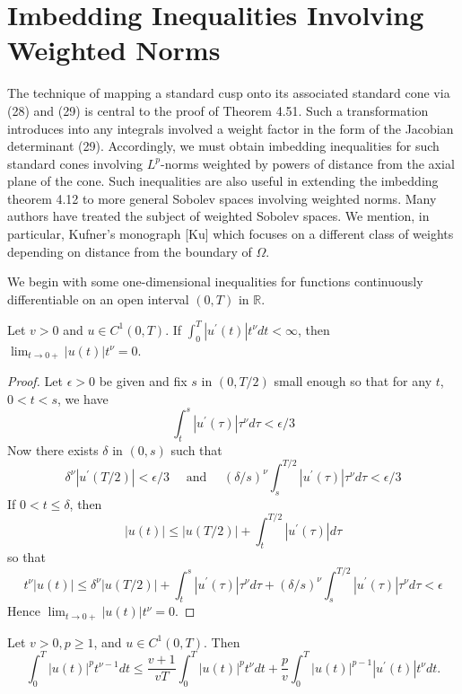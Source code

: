 \section{Imbedding Inequalities Involving Weighted Norms}


\begin{para}
  The technique of mapping a standard cusp onto its associated standard cone via (28) and (29) is central to the proof of Theorem 4.51. Such a transformation introduces into any integrals involved a weight factor in the form of the Jacobian determinant (29). Accordingly, we must obtain imbedding inequalities for such standard cones involving $L^p$-norms weighted by powers of distance from the axial plane of the cone. Such inequalities are also useful in extending the imbedding theorem 4.12 to more general Sobolev spaces involving weighted norms. Many authors have treated the subject of weighted Sobolev spaces. We mention, in
  particular, Kufner's monograph [Ku] which focuses on a different class of weights depending on distance from the boundary of $\Omega$.
\end{para}

We begin with some one-dimensional inequalities for functions continuously differentiable on an open interval $(0, T)$ in $\mathbb{R}$.


\begin{lemma}
  Let $v>0$ and $u \in C^1(0, T)$. If $\int_0^T\left|u^{\prime}(t)\right| t^\nu d t<\infty$, then $\lim _{t \rightarrow 0+}|u(t)| t^\nu=0$.
\end{lemma}

\begin{proof}
  Let $\epsilon>0$ be given and fix $s$ in $(0, T / 2)$ small enough so that for any $t$, $0<t<s$, we have
  \[
  \int_t^s\left|u^{\prime}(\tau)\right| \tau^\nu d \tau<\epsilon / 3
  \]
  Now there exists $\delta$ in $(0, s)$ such that
  \[
  \delta^\nu\left|u^{\prime}(T / 2)\right|<\epsilon / 3 \quad \text { and } \quad(\delta / s)^\nu \int_s^{T / 2}\left|u^{\prime}(\tau)\right| \tau^\nu d \tau<\epsilon / 3
  \]
  If $0<t \leq \delta$, then
  \[
  |u(t)| \leq|u(T / 2)|+\int_t^{T / 2}\left|u^{\prime}(\tau)\right| d \tau
  \]
  so that
  \[
  t^\nu|u(t)| \leq \delta^\nu|u(T / 2)|+\int_t^s\left|u^{\prime}(\tau)\right| \tau^\nu d \tau+(\delta / s)^\nu \int_s^{T / 2}\left|u^{\prime}(\tau)\right| \tau^\nu d \tau<\epsilon
  \]
  Hence $\lim _{t \rightarrow 0+}|u(t)| t^\nu=0$.
\end{proof}


\begin{lemma}
  Let $v>0, p \geq 1$, and $u \in C^1(0, T)$. Then
  \[
  \int_0^T|u(t)|^p t^{\nu-1} d t \leq \frac{v+1}{v T} \int_0^T|u(t)|^p t^\nu d t+\frac{p}{v} \int_0^T|u(t)|^{p-1}\left|u^{\prime}(t)\right| t^\nu d t .
  \]
\end{lemma}


